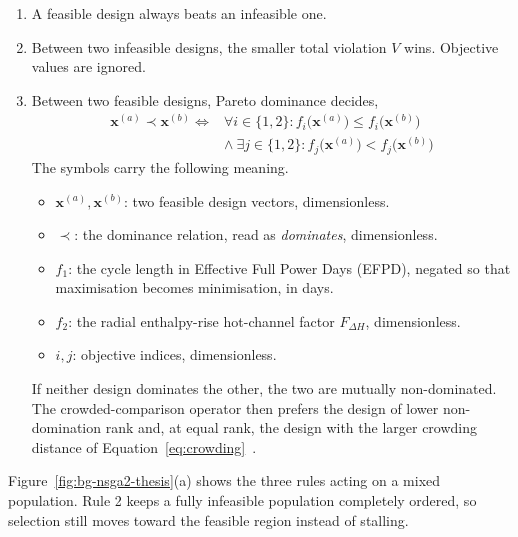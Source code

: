 \begin{enumerate}
  \item A feasible design always beats an infeasible one.

  \item Between two infeasible designs, the smaller total violation
        $V$ wins. Objective values are ignored.

  \item Between two feasible designs, Pareto dominance decides,
        \begin{equation}
        \begin{split}
          \mathbf{x}^{(a)} \prec \mathbf{x}^{(b)}
          \iff
          & \forall i \in \{1,2\} :
            f_i\bigl(\mathbf{x}^{(a)}\bigr) \le f_i\bigl(\mathbf{x}^{(b)}\bigr) \\
          & \wedge\
            \exists j \in \{1,2\} :
            f_j\bigl(\mathbf{x}^{(a)}\bigr) < f_j\bigl(\mathbf{x}^{(b)}\bigr)
        \end{split}
        \label{eq:pareto-dominance-feasible}
        \end{equation}
        The symbols carry the following meaning.
        \begin{itemize}
          \item $\mathbf{x}^{(a)}, \mathbf{x}^{(b)}$: two feasible
                design vectors, dimensionless.
          \item $\prec$: the dominance relation, read as
                \emph{dominates}, dimensionless.
          \item $f_1$: the cycle length in Effective Full Power Days
                (EFPD), negated so that maximisation becomes
                minimisation, in days.
          \item $f_2$: the radial enthalpy-rise hot-channel factor
                $F_{\Delta H}$, dimensionless.
          \item $i, j$: objective indices, dimensionless.
        \end{itemize}
        If neither design dominates the other, the two are mutually
        non-dominated. The crowded-comparison operator then prefers the
        design of lower non-domination rank and, at equal rank, the
        design with the larger crowding distance of
        Equation~\eqref{eq:crowding}~\cite{deb_nsga2_2002}.
\end{enumerate}

Figure~\ref{fig:bg-nsga2-thesis}(a) shows the three rules acting on a
mixed population. Rule 2 keeps a fully infeasible population
completely ordered, so selection still moves toward the feasible
region instead of stalling.

